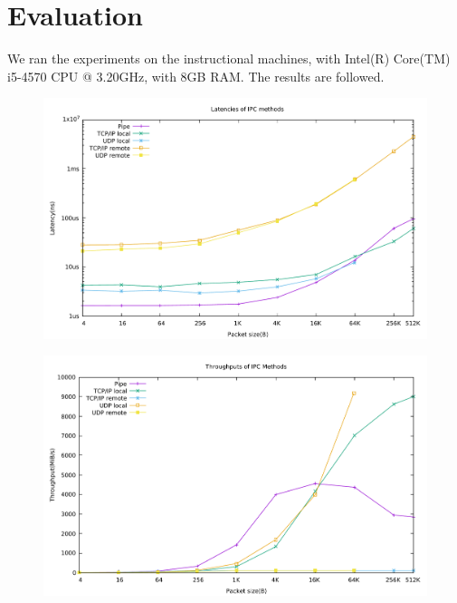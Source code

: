\section{Evaluation}

We ran the experiments on the instructional machines, with Intel(R) Core(TM) i5-4570 CPU @ 3.20GHz, with 8GB RAM. The results are followed.


\begin{figure}[!ht]
\includegraphics[width=.7\linewidth]{figures/latency}
\label{figure:latency}
\end{figure}

\begin{figure}[!ht]
    \includegraphics[width=.7\linewidth]{figures/throughput.pdf}
    \label{figure:throughput}
\end{figure}
